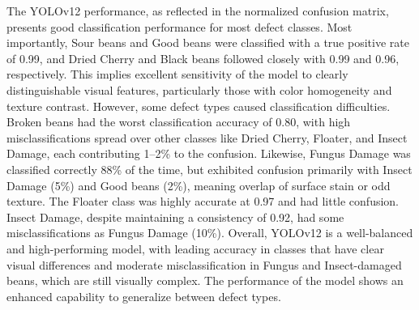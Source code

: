 The YOLOv12 performance, as reflected in the normalized confusion matrix, presents good classification performance for most defect classes. Most importantly, Sour beans and Good beans were classified with a true positive rate of 0.99, and Dried Cherry and Black beans followed closely with 0.99 and 0.96, respectively. This implies excellent sensitivity of the model to clearly distinguishable visual features, particularly those with color homogeneity and texture contrast. However, some defect types caused classification difficulties. Broken beans had the worst classification accuracy of 0.80, with high misclassifications spread over other classes like Dried Cherry, Floater, and Insect Damage, each contributing 1–2\% to the confusion. Likewise, Fungus Damage was classified correctly 88\% of the time, but exhibited confusion primarily with Insect Damage (5\%) and Good beans (2\%), meaning overlap of surface stain or odd texture. The Floater class was highly accurate at 0.97 and had little confusion. Insect Damage, despite maintaining a consistency of 0.92, had some misclassifications as Fungus Damage (10\%). Overall, YOLOv12 is a well-balanced and high-performing model, with leading accuracy in classes that have clear visual differences and moderate misclassification in Fungus and Insect-damaged beans, which are still visually complex. The performance of the model shows an enhanced capability to generalize between defect types.

